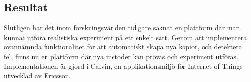 \documentclass{article}
\begin{document}
\begin{multicols}{2}
\section*{Resultat}
Slutligen har det inom forskningsvärlden tidigare saknat en plattform där man kunnat utföra realistiska experiment på ett enkelt sätt. Genom att implementera ovannämnda funktionalitet för att automatiskt skapa nya kopior, och detektera fel, finns nu en plattform där nya metoder kan prövas och experiment utföras. Implementationen är gjord i Calvin, en applikationsmiljö för Internet of Things utvecklad av Ericsson.

\end{multicols}
 
\end{document}

